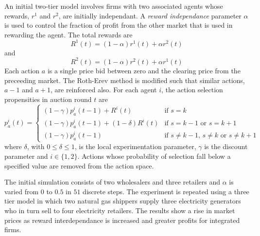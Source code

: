 An initial two-tier model involves firms with two associated agents
whose rewards, $r^1$ and $r^2$, are initially independant.  A \textit{reward
independance} parameter $\alpha$ is used to control the fraction of profit from the other
market that is used in rewarding the agent.  The total rewards are
\begin{equation}
R^1(t) = (1-\alpha)r^1(t) + \alpha r^2(t)
\end{equation}
and
\begin{equation}
R^2(t) = (1-\alpha)r^2(t) + \alpha r^1(t)
\end{equation}
Each action $a$ is a single price bid between zero and the clearing price from
the preceeding market.  The Roth-Erev method is modified such that similar
actions, $a-1$ and $a+1$, are reinforced also.  For each agent $i$, the action
selection propensities in auction round $t$ are
\begin{equation}
p^i_a(t) = \begin{cases}
(1-\gamma)p^i_a(t-1) + R^i(t)& \text{if $s=k$}\\
(1-\gamma)p^i_a(t-1) + (1-\delta)R^i(t)& \text{if $s=k-1$ or $s=k+1$}\\
(1-\gamma)p^i_a(t-1)& \text{if $s\neq k-1$, $s\neq k$ or $s\neq k+1$}
\end{cases}
\end{equation}
where $\delta$, with $0\leq \delta \leq 1$, is the local experimentation
parameter, $\gamma$ is the discount parameter and $i\in \lbrace 1,2 \rbrace$.
Actions whose probability of selection fall below a specified value are
removed from the action space.

The initial simulation consists of two wholesalers and three retailers and
$\alpha$ is varied from $0$ to $0.5$ in $51$ discrete steps.  The experiment
is repeated using a three tier model in which two natural gas shippers supply
three electricity generators who in turn sell to four electricity retailers.
The results show a rise in market prices as reward interdependance is
increased and greater profits for integrated firms.

